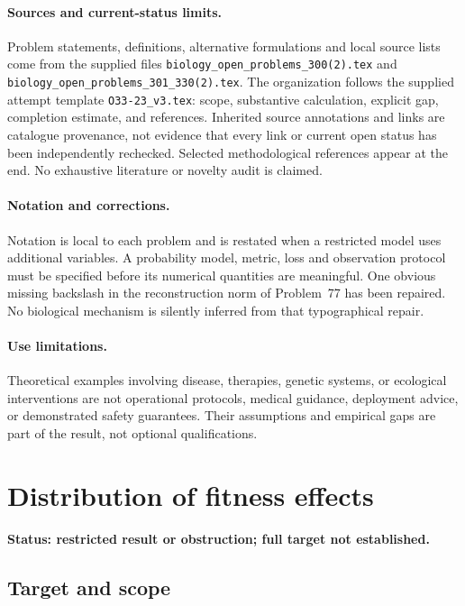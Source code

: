 \documentclass[11pt]{article}
\begin{document}
\paragraph{Sources and current-status limits.}
Problem statements, definitions, alternative formulations and local source lists
come from the supplied files
\texttt{biology\_open\_problems\_300(2).tex} and
\texttt{biology\_open\_problems\_301\_330(2).tex}.
The organization follows the supplied attempt template
\texttt{O33-23\_v3.tex}: scope, substantive calculation, explicit gap,
completion estimate, and references. Inherited source annotations and links are
catalogue provenance, not evidence that every link or current open status has
been independently rechecked. Selected methodological references appear at the
end. No exhaustive literature or novelty audit is claimed.

\paragraph{Notation and corrections.}
Notation is local to each problem and is restated when a restricted model uses
additional variables. A probability model, metric, loss and observation protocol
must be specified before its numerical quantities are meaningful. One obvious
missing backslash in the reconstruction norm of Problem~77 has been repaired.
No biological mechanism is silently inferred from that typographical repair.

\paragraph{Use limitations.}
Theoretical examples involving disease, therapies, genetic systems, or ecological
interventions are not operational protocols, medical guidance, deployment advice,
or demonstrated safety guarantees. Their assumptions and empirical gaps are part
of the result, not optional qualifications.


\section*{Distribution of fitness effects}
\label{prob:168}
\noindent\textbf{Status: restricted result or obstruction; full target not established.}
\subsection{Target and scope}
\end{document}
